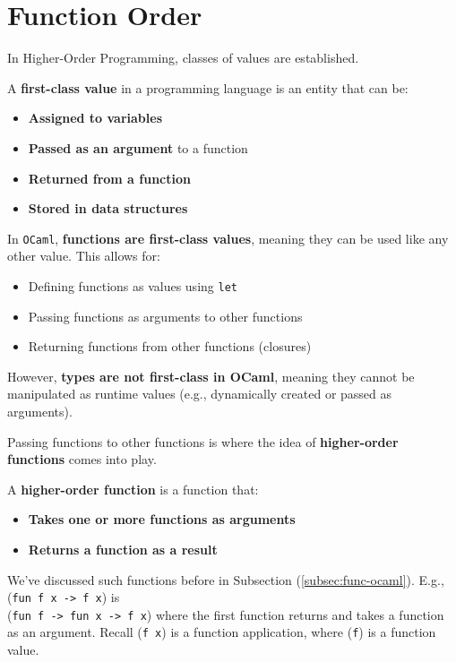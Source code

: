 \section{Function Order}
In Higher-Order Programming, classes of values are established.

\begin{Def}

    \noindent
    A \textbf{first-class value} in a programming language is an entity that can be:
    \begin{itemize}
        \item \textbf{Assigned to variables}
        \item \textbf{Passed as an argument} to a function
        \item \textbf{Returned from a function}
        \item \textbf{Stored in data structures}
    \end{itemize}

    \noindent
    In \texttt{OCaml}, \textbf{functions are first-class values}, meaning they can be used like any other value. This allows for:
    \begin{itemize}
        \item Defining functions as values using \texttt{let}
        \item Passing functions as arguments to other functions
        \item Returning functions from other functions (closures)
    \end{itemize}

    \noindent
    However, \textbf{types are not first-class in OCaml}, meaning they cannot be manipulated as runtime values (e.g., dynamically created or passed as arguments).
\end{Def}

\noindent 
Passing functions to other functions is where the idea of \textbf{higher-order functions} comes into play.
\begin{Def}

    \noindent
    A \textbf{higher-order function} is a function that:
    \begin{itemize}
        \item \textbf{Takes one or more functions as arguments}
        \item \textbf{Returns a function as a result}
    \end{itemize}

    \noindent
    We've discussed such functions before in Subsection (\ref{subsec:func-ocaml}). E.g.,
    (\texttt{fun f x -> f x}) is\\ (\texttt{fun f -> fun x -> f x}) where the first function returns and takes a function as an argument.
    Recall (\texttt{f x}) is a function application, where (\texttt{f}) is a function value.

\end{Def}

